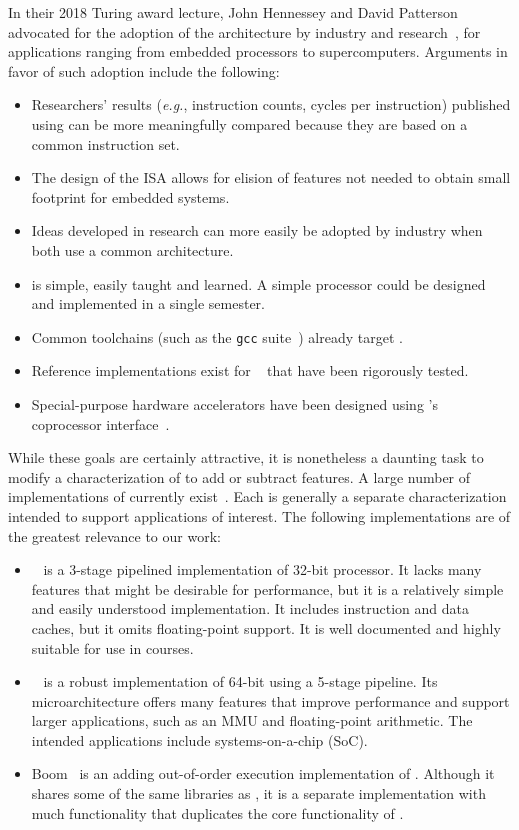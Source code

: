 \documentclass[conference]{IEEEtran}
\begin{document}
In their 2018 Turing award lecture, John Hennessey and David Patterson advocated for the adoption of the \Riscv{} architecture by industry and research~\cite{HPTuring}, for applications ranging from embedded processors to supercomputers.  Arguments in favor of such adoption include the following:
\begin{itemize}
    \item Researchers' results (\textit{e.g.}, instruction counts,  cycles per instruction) published using \Riscv{} can be more meaningfully compared because they are based on a common instruction set.
    \item The design of the \Riscv{} ISA allows for elision of features not needed to obtain small footprint for embedded systems.
    \item Ideas developed in research can more easily be adopted by industry when both use a common architecture.
    \item \Riscv{} is simple, easily taught and learned.  A simple processor could be designed and implemented in a single semester.
    \item Common toolchains (such as the \texttt{gcc} suite~\cite{gcc}) already target \Riscv{}.
    \item Reference implementations exist for \Riscv{}~\cite{chisel:riscv,RvMini} that have been rigorously tested.
    \item Special-purpose hardware accelerators have been designed using \Riscv's coprocessor interface~\cite{accels}.
\end{itemize}
While these goals are certainly attractive, it is nonetheless a daunting task to modify a characterization of \Riscv{} to add or subtract features.  A large number of implementations of \Riscv{} currently exist~\cite{riscvimplementations}.  Each is generally a separate characterization intended to support applications of interest.  The following implementations are of the greatest relevance to our work:
\begin{itemize}
   \item \Riscvmini{}~\cite{RvMini} is a 3-stage pipelined implementation of 32-bit \Riscv{} processor. It lacks many features that might be desirable for performance, but it is a relatively simple and easily understood implementation.  It includes instruction and data caches, but it omits floating-point support.  It is well documented and highly suitable for use in courses.
   \item \Rocketchip{}~\cite{chisel:riscv} is a robust implementation of 64-bit \Riscv{} using a 5-stage pipeline.  Its microarchitecture offers many features that improve performance and support larger applications, such as an MMU and floating-point arithmetic.  The intended applications include systems-on-a-chip (SoC).
   \item Boom~\cite{boom} is an adding out-of-order execution implementation of \Riscv{}. Although it shares some of the same libraries as \Rocketchip{}, it is a separate implementation with much functionality that duplicates the core functionality of \Rocketchip{}.
\end{itemize}
\end{document}

